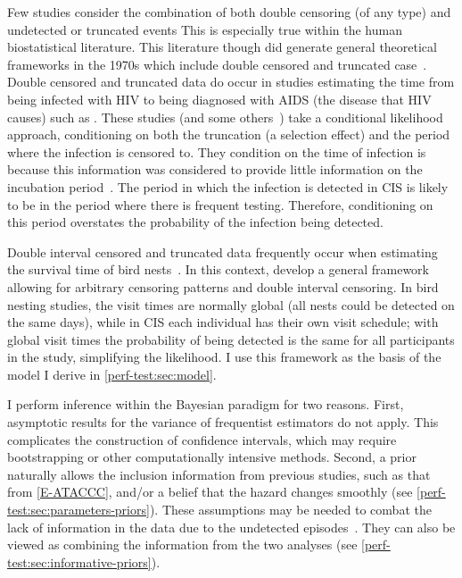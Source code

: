 \documentclass[thesis.tex]{subfiles}
\begin{document}
Few studies consider the combination of both double censoring (of any type) and undetected or truncated events
This is especially true within the human biostatistical literature.
This literature though did generate general theoretical frameworks in the 1970s which include double censored and truncated case~\autocites{turnbullEmpirical}{dempsterMaximum}.
Double censored and truncated data do occur in studies estimating the time from being infected with HIV to being diagnosed with AIDS (the disease that HIV causes) such as \textcite{sunEmpirical,bacchettiNonparametric}.
These studies (and some others~\autocite{shenNonparametric}) take a conditional likelihood approach, conditioning on both the truncation (a selection effect) and the period where the infection is censored to.
They condition on the time of infection is because this information was considered to provide little information on the incubation period~.
The period in which the infection is detected in CIS is likely to be in the period where there is frequent testing.
Therefore, conditioning on this period overstates the probability of the infection being detected.

Double interval censored and truncated data frequently occur when estimating the survival time of bird nests~\autocite{heiseyABCs}.
In this context, \textcite{heiseyModelling} develop a general framework allowing for arbitrary censoring patterns and double interval censoring.
In bird nesting studies, the visit times are normally global (all nests could be detected on the same days), while in CIS each individual has their own visit schedule; with global visit times the probability of being detected is the same for all participants in the study, simplifying the likelihood.
I use this framework as the basis of the model I derive in \cref{perf-test:sec:model}.

I perform inference within the Bayesian paradigm for two reasons.
First, asymptotic results for the variance of frequentist estimators do not apply.
This complicates the construction of confidence intervals, which may require bootstrapping or other computationally intensive methods.
Second, a prior naturally allows the inclusion information from previous studies, such as that from \cref{E-ATACCC}, and/or a belief that the hazard changes smoothly (see \cref{perf-test:sec:parameters-priors}).
These assumptions may be needed to combat the lack of information in the data due to the undetected episodes~\autocite{caoBias}.
They can also be viewed as combining the information from the two analyses (see \cref{perf-test:sec:informative-priors}).
\end{document}
